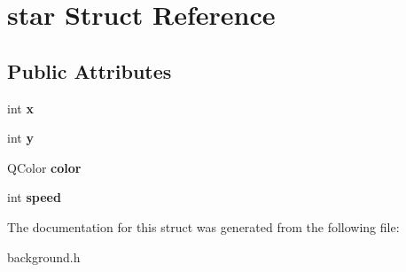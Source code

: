 \hypertarget{structstar}{}\section{star Struct Reference}
\label{structstar}
\subsection*{Public Attributes}
\begin{DoxyCompactItemize}
\item 
\mbox{\label{structstar_ae7e9935c7a2052ec9f292c6a95ad16dc}} 
int {\bfseries x}
\item 
\mbox{\label{structstar_a5532234288af217e0113dcc1ab7f1072}} 
int {\bfseries y}
\item 
\mbox{\label{structstar_af34562c391e08523e96e2ea2ca16f60d}} 
Q\+Color {\bfseries color}
\item 
\mbox{\label{structstar_a684efdbc7fa0ea5230e760f0881ae5ca}} 
int {\bfseries speed}
\end{DoxyCompactItemize}


The documentation for this struct was generated from the following file\+:\begin{DoxyCompactItemize}
\item 
background.\+h\end{DoxyCompactItemize}

